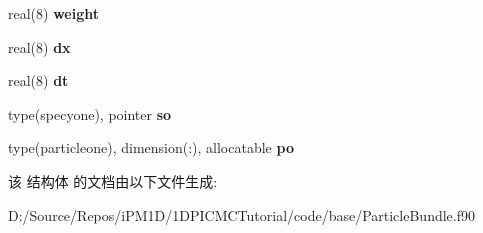 \begin{DoxyCompactItemize}
real(8) {\bfseries weight}
\item 
\mbox{\label{structmoduleparticlebundle_1_1particlebundle_a49af226e516ea4ae6e49bbf7d6e618b1}} 
real(8) {\bfseries dx}
\item 
\mbox{\label{structmoduleparticlebundle_1_1particlebundle_a52dadd43bc8413c722c1edf7a9bd5973}} 
real(8) {\bfseries dt}
\item 
\mbox{\label{structmoduleparticlebundle_1_1particlebundle_a2829c36640ad6b65b3784c149975d688}} 
type(specyone), pointer {\bfseries so}
\item 
\mbox{\label{structmoduleparticlebundle_1_1particlebundle_a906074799bd905dee64c8d84fe16fc77}} 
type(particleone), dimension(\+:), allocatable {\bfseries po}
\end{DoxyCompactItemize}


该 结构体 的文档由以下文件生成\+:\begin{DoxyCompactItemize}
\item 
D\+:/\+Source/\+Repos/i\+P\+M1\+D/1\+D\+P\+I\+C\+M\+C\+Tutorial/code/base/Particle\+Bundle.\+f90\end{DoxyCompactItemize}
